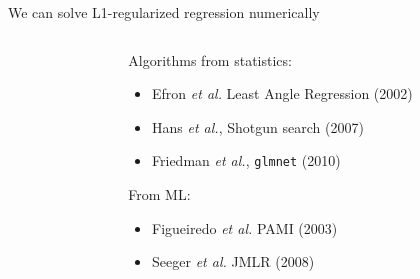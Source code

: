 \documentclass[
  ignorenonframetext,
  aspectratio=169]{beamer}
\begin{document}
\begin{frame}[fragile]{We can solve L1-regularized regression
numerically}
\protect\hypertarget{we-can-solve-l1-regularized-regression-numerically}{}
\begin{columns}[T]
\begin{column}{.45\textwidth}
\scriptsize


\normalsize
\end{column}

\begin{column}{.45\textwidth}
Algorithms from statistics:

\begin{itemize}
\item
  Efron \emph{et al.} Least Angle Regression (2002)
\item
  Hans \emph{et al.}, Shotgun search (2007)
\item
  Friedman \emph{et al.}, \texttt{glmnet} (2010)
\end{itemize}

From ML:

\begin{itemize}
\item
  Figueiredo \emph{et al.} PAMI (2003)
\item
  Seeger \emph{et al.} JMLR (2008)
\end{itemize}
\end{column}
\end{columns}
\end{frame}
\end{document}
